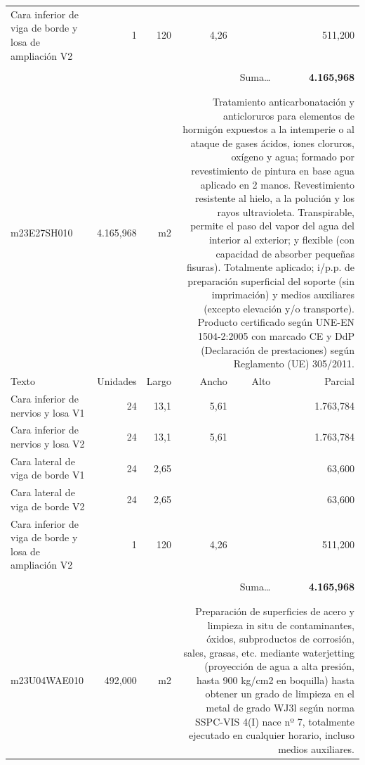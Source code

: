 \documentclass{book}%
\begin{document}
\begin{longtable}{lrrrrr}
\multicolumn{1}{p{3.5cm}}{Cara inferior de viga de borde y losa de ampliación V2}&1&120&4,26&&   511,200\\%
&&&&&\\%
\multicolumn{5}{r}{Suma\ldots}&\textbf{ 4.165,968}\\%
\hline%
&&&&&\\%
&&&&&\\%
m23E27SH010& 4.165,968& m2&\multicolumn{3}{p{6cm}}{\scriptsize Tratamiento anticarbonatación y anticloruros para elementos de hormigón expuestos a la intemperie o al ataque de gases ácidos, iones cloruros, oxígeno y agua; formado por revestimiento de pintura en base agua aplicado en 2 manos. Revestimiento resistente al hielo, a la polución y los rayos ultravioleta. Transpirable, permite el paso del vapor del agua del interior al exterior; y flexible (con capacidad de absorber pequeñas fisuras). Totalmente aplicado; i/p.p. de preparación superficial del soporte (sin imprimación) y medios auxiliares (excepto elevación y/o transporte). Producto certificado según UNE-EN 1504-2:2005 con marcado CE y DdP (Declaración de prestaciones) según Reglamento (UE) 305/2011.\normalsize}\\%
Texto&Unidades&Largo&Ancho&Alto&Parcial\\%
\hline%
\multicolumn{1}{p{3.5cm}}{Cara inferior de nervios y losa V1}&24&13,1&5,61&& 1.763,784\\%
\multicolumn{1}{p{3.5cm}}{Cara inferior de nervios y losa V2}&24&13,1&5,61&& 1.763,784\\%
\multicolumn{1}{p{3.5cm}}{Cara lateral de viga de borde V1}&24&2,65&&&    63,600\\%
\multicolumn{1}{p{3.5cm}}{Cara lateral de viga de borde V2}&24&2,65&&&    63,600\\%
\multicolumn{1}{p{3.5cm}}{Cara inferior de viga de borde y losa de ampliación V2}&1&120&4,26&&   511,200\\%
&&&&&\\%
\multicolumn{5}{r}{Suma\ldots}&\textbf{ 4.165,968}\\%
\hline%
&&&&&\\%
&&&&&\\%
m23U04WAE010&   492,000& m2&\multicolumn{3}{p{6cm}}{\scriptsize Preparación de superficies de acero y limpieza in situ de contaminantes, óxidos, subproductos de corrosión, sales, grasas, etc. mediante waterjetting (proyección de agua a alta presión, hasta 900 kg/cm2 en boquilla) hasta obtener un grado de limpieza en el metal de grado WJ3l según norma SSPC-VIS 4(I) nace nº 7, totalmente ejecutado en cualquier horario, incluso medios auxiliares.\normalsize}\\%

\end{longtable}
\end{document}
